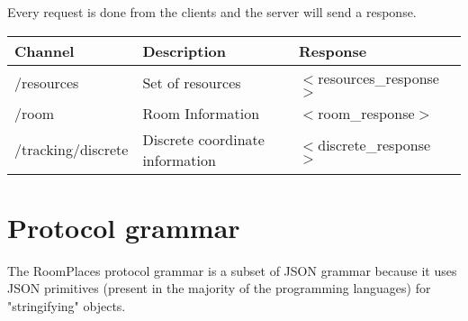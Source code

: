 Every request is done from the clients and the server will send a response. 
\begin{table}
\centering
\begin{tabular}{ | l | l | l | l | }
    \hline Channel & Description & Response \\
    \hline /resources                & Set of resources                 & $<$resources\_response$>$ \\
    \hline /room                     & Room Information                 & $<$room\_response$>$ \\
    \hline /tracking/discrete        & Discrete coordinate information  & $<$discrete\_response$>$ \\
    \hline
\end{tabular}
\end{table}

\section{Protocol grammar}
The RoomPlaces protocol grammar is a subset of JSON grammar because it uses JSON primitives (present in the majority of the programming languages) for "stringifying" objects.

